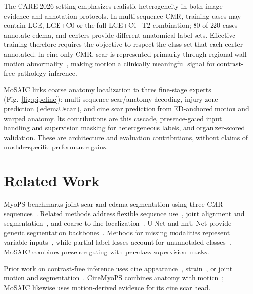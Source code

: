 \documentclass[runningheads]{llncs}
\begin{document}
The CARE-2026 setting emphasizes realistic heterogeneity in both image evidence
and annotation protocols. In multi-sequence CMR, training cases may contain LGE,
LGE+C0 or the full LGE+C0+T2 combination; 80 of 220 cases annotate edema, and
centers provide different anatomical label sets. Effective training therefore
requires the objective to respect the class set that each center annotated. In
cine-only CMR, scar is represented primarily through regional wall-motion
abnormality~\cite{zhang2019deeplearningcine,ding2025cinemyops}, making motion a
clinically meaningful signal for contrast-free pathology inference.

MoSAIC links coarse anatomy localization to three fine-stage experts
(Fig.~\ref{fig:pipeline}): multi-sequence scar/anatomy decoding, injury-zone
prediction ($\text{edema}\cup\text{scar}$), and cine scar prediction from
ED-anchored motion and warped anatomy. Its contributions are this cascade,
presence-gated input handling and supervision masking for heterogeneous labels,
and organizer-scored validation. These are architecture and evaluation
contributions, without claims of module-specific performance gains.

\section{Related Work}

MyoPS benchmarks joint scar and edema segmentation using three CMR
sequences~\cite{zhuang2019multivariate,li2023myops}. Related methods address flexible
sequence use~\cite{qiu2023myopsnet}, joint alignment and
segmentation~\cite{ding2023aligning}, and coarse-to-fine
localization~\cite{zhai2020coarsemyops,wang2022awsnet}. U-Net and nnU-Net provide
generic segmentation backbones~\cite{ronneberger2015unet,isensee2021nnunet}.
Methods for missing modalities represent variable inputs~\cite{havaei2016hemis,dorent2019hetero},
while partial-label losses account for unannotated
classes~\cite{shi2021marginal,zhou2019priorpartial,fidon2021labelsetloss}.
MoSAIC combines presence gating with per-class supervision masks.

Prior work on contrast-free inference uses cine
appearance~\cite{zhang2019deeplearningcine},
strain~\cite{scatteia2017strain,morales2021deepstrain}, or joint motion and
segmentation~\cite{qin2018jointmotion}. CineMyoPS combines anatomy with
motion~\cite{ding2025cinemyops}; MoSAIC likewise uses motion-derived evidence
for its cine scar head.
\end{document}
